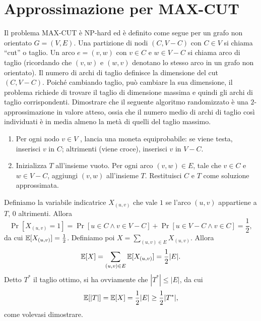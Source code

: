 \chapter{Approssimazione per MAX-CUT}

\begin{problem*}
    Il problema MAX-CUT è NP-hard ed è definito come segue per 
    un grafo non orientato \(G = (V, E)\). Una partizione di nodi \((C, V - C)\)
    con \(C \in V\) si chiama “cut” o taglio. Un arco \(e = (v, w)\) con \(v \in 
    C\) e \(w \in V - C\) si chiama arco di taglio (ricordando che \((v, w)\) e 
    \((w, v)\) denotano lo stesso arco in un grafo non orientato). Il numero di 
    archi di taglio definisce la dimensione del cut \((C, V - C)\). Poiché 
    cambiando taglio, può cambiare la sua dimensione, il problema richiede di 
    trovare il taglio di dimensione massima e quindi gli archi di taglio 
    corrispondenti. Dimostrare che il seguente algoritmo randomizzato è una 
    \(2\)-approssimazione in valore atteso, ossia che il numero medio di archi di 
    taglio così individuati è in media almeno la metà di quelli del taglio  
    massimo. 
    \begin{enumerate}
        \item Per ogni nodo \(v \in V\) , lancia una moneta equiprobabile: se 
        viene testa, inserisci \(v\) in \(C\); altrimenti (viene croce), inserisci 
        \(v\) in \(V - C\). 
        \item Inizializza \(T\) all’insieme vuoto. Per ogni arco \((v, w) \in E\), 
        tale che \(v \in C\) e \(w \in V - C\), aggiungi \((v, w)\) all’insieme 
        \(T\). Restituisci \(C\) e \(T\) come soluzione approssimata.
    \end{enumerate}
\end{problem*}

Definiamo la variabile indicatrice \(X_{(u,v)}\) che vale \(1\) se l'arco \((u,v)\)
appartiene a \(T\), \(0\) altrimenti. Allora \[\Pr[X_{(u,v)}=1]=\Pr[u \in C \wedge 
v\in V-C] + \Pr[u\in V-C \wedge v\in C] = \frac12,\] da cui 
\(\mathbb{E}[X_{(u,v)}]=\frac12\). Definiamo poi \(\displaystyle X = \sum_{(u, v)\in 
E}X_{(u, v)}\). Allora \[\mathbb{E}[X]=\sum_{(u, v)\in E}\mathbb{E}[X_{(u, v)}]=\frac12|E|.\]
Detto \(T^*\) il taglio ottimo, si ha ovviamente che \(|T^*|\le|E|\), da cui 
\[\mathbb{E}[|T|]=\mathbb{E}[X]=\frac12|E|\ge\frac12|T^*|,\]come volevasi dimostrare. 
